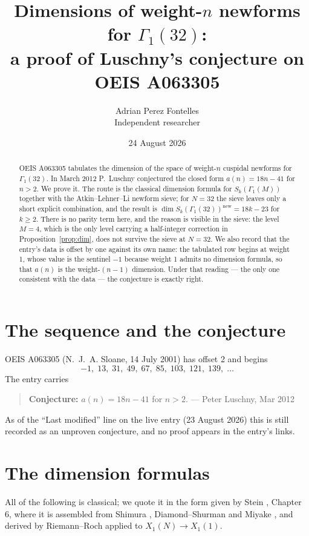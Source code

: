 \documentclass[11pt,a4paper]{article}
\title{Dimensions of weight-$n$ newforms for $\Gamma_{1}(32)$:\\
a proof of Luschny's conjecture on OEIS A063305}
\author{Adrian Perez Fontelles\\ \small Independent researcher}
\date{24 August 2026}
\theoremstyle{plain}
\theoremstyle{definition}
\begin{document}
\maketitle

\begin{abstract}
OEIS A063305 tabulates the dimension of the space of weight-$n$ cuspidal newforms for
$\Gamma_{1}(32)$. In March 2012 P.~Luschny conjectured the closed form $a(n)=18n-41$ for
$n>2$. We prove it. The route is the classical dimension formula for $S_{k}(\Gamma_{1}(M))$
together with the Atkin--Lehner--Li newform sieve; for $N=32$ the sieve leaves only a short
explicit combination, and the result is $\dim S_{k}(\Gamma_{1}(32))^{\mathrm{new}}=18k-23$
for $k\ge2$. There is no parity term here, and the reason is visible in the sieve: the
level $M=4$, which is the only level carrying a half-integer correction in
Proposition~\ref{prop:dim}, does not survive the sieve at $N=32$. We also record that the
entry's data is offset by one against its own name: the tabulated row begins at weight 1,
whose value is the sentinel $-1$ because weight 1 admits no dimension formula, so that
$a(n)$ is the weight-$(n-1)$ dimension. Under that reading --- the only one consistent with
the data --- the conjecture is exactly right.
\end{abstract}

\section{The sequence and the conjecture}

OEIS A063305 (N.~J.~A. Sloane, 14 July 2001) has offset 2 and begins
\[
  -1,\;13,\;31,\;49,\;67,\;85,\;103,\;121,\;139,\;\dots
\]
The entry carries

\begin{quote}
\textbf{Conjecture:} $a(n)=18n-41$ for $n>2$. --- Peter Luschny, Mar 2012
\end{quote}

As of the ``Last modified'' line on the live entry (23 August 2026) this is still recorded
as an unproven conjecture, and no proof appears in the entry's links.

\section{The dimension formulas}

All of the following is classical; we quote it in the form given by Stein \cite{stein},
Chapter 6, where it is assembled from Shimura \cite[\S2.6]{shimura}, Diamond--Shurman
\cite[Ch.~3]{ds} and Miyake \cite[\S2.5]{miyake}, and derived by Riemann--Roch applied to
$X_{1}(N)\to X_{1}(1)$.
\end{document}
